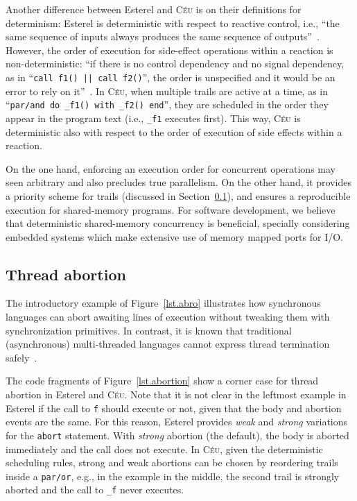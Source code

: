 \documentclass{acm_proc_article-sp}
\newcommand{\CEU}{\textsc{C\'{e}u}\xspace}
\newcommand{\code}[1] {{\small{\texttt{#1}}}}
\newcommand{\1}{\;}
\newcommand{\2}{\;\;}
\newcommand{\3}{\;\;\;}
\newcommand{\5}{\;\;\;\;\;}
\begin{document}
Another difference between Esterel and \CEU is on their definitions for 
determinism:
%
Esterel is deterministic with respect to reactive control, i.e., ``the same 
sequence of inputs always produces the same sequence of 
outputs''~\cite{esterel.primer}.
However, the order of execution for side-effect operations within a reaction is 
non-deterministic: ``if there is no control dependency and no signal 
dependency, as in ``\code{call f1() || call f2()}'', the order is unspecified 
and it would be an error to rely on it''~\cite{esterel.primer}.
%
In \CEU, when multiple trails are active at a time, as in
``\code{par/and~do~\_f1()~with~\_f2()~end}'', they are scheduled in the order 
they appear in the program text (i.e., \code{\_f1} executes first).
%
This way, \CEU is deterministic also with respect to the order of execution of 
side effects within a reaction.

On the one hand, enforcing an execution order for concurrent operations may 
seen arbitrary and also precludes true parallelism.
On the other hand, it provides a priority scheme for trails (discussed in 
Section~\ref{sec.ceu.abortion}), and ensures a reproducible execution for 
shared-memory programs.
%
For software development, we believe that deterministic shared-memory 
concurrency is beneficial, specially considering embedded systems which make 
extensive use of memory mapped ports for I/O.

\subsection{Thread abortion}
\label{sec.ceu.abortion}

The introductory example of Figure~\ref{lst.abro} illustrates how synchronous 
languages can abort awaiting lines of execution without tweaking them with 
synchronization primitives.
In contrast, it is known that traditional (asynchronous) multi-threaded 
languages cannot express thread termination 
safely~\cite{esterel.preemption,sync_async.threadsstop}.

The code fragments of Figure~\ref{lst.abortion} show a corner case for thread 
abortion in Esterel and \CEU.
%
Note that it is not clear in the leftmost example in Esterel if the call to 
\code{f} should execute or not, given that the body and abortion events are the 
same.
%
For this reason, Esterel provides \emph{weak} and \emph{strong} variations for 
the \code{abort} statement.
With \emph{strong} abortion (the default), the body is aborted immediately and 
the call does not execute.
%
In \CEU, given the deterministic scheduling rules, strong and weak abortions 
can be chosen by reordering trails inside a \code{par/or}, e.g., in the example 
in the middle, the second trail is strongly aborted and the call to \code{\_f} 
never executes.
\end{document}
